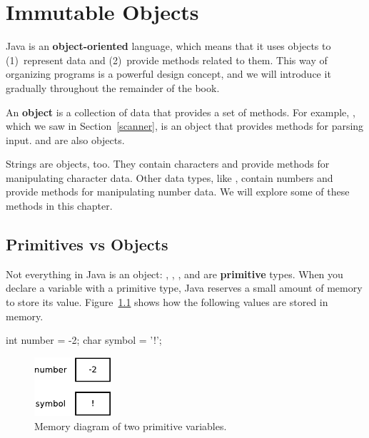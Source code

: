 \chapter{Immutable Objects}
\label{immutable}


Java is an {\bf object-oriented} language, which means that it uses objects to (1)~represent data and (2)~provide methods related to them.
This way of organizing programs is a powerful design concept, and we will introduce it gradually throughout the remainder of the book.


An {\bf object} is a collection of data that provides a set of methods.
For example, , which we saw in Section~\ref{scanner}, is an object that provides methods for parsing input.
 and  are also objects.

Strings are objects, too.
They contain characters and provide methods for manipulating character data.
Other data types, like , contain numbers and provide methods for manipulating number data.
We will explore some of these methods in this chapter.


\section{Primitives vs Objects}


Not everything in Java is an object: , , , and  are {\bf primitive} types.
When you declare a variable with a primitive type, Java reserves a small amount of memory to store its value.
Figure~\ref{fig.mem1} shows how the following values are stored in memory.

\begin{code}
int number = -2;
char symbol = '!';
\end{code}

\begin{figure}[!ht]
\begin{center}
\includegraphics[width=80pt]{figs/mem1.pdf}
\caption{Memory diagram of two primitive variables.}
\label{fig.mem1}
\end{center}
\end{figure}

